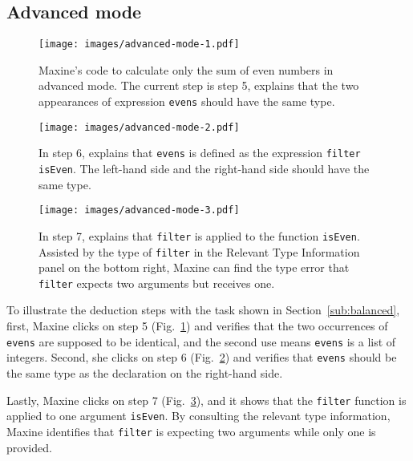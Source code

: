 \subsection{Advanced mode}  \label{sub:advanced}



\begin{figure}[ht]
        \centering
        \texttt{[image: images/advanced-mode-1.pdf]}
        \caption[\chameleon{} walkthrough - advanced mode (1)]{
            Maxine's code to calculate only the sum 
            of even numbers in advanced mode. 
            The current step is step 5, \chameleon{} 
            explains that the two appearances of expression 
            \texttt{evens} should have the same type.
        }
        \label{fig:advanced-mode-step5}
\end{figure}

\begin{figure}[ht]
        \centering
        \texttt{[image: images/advanced-mode-2.pdf]}
        \caption[\chameleon{} walkthrough - advanced mode (2)]{
            In step 6, \chameleon{} 
            explains that \texttt{evens} is defined as
            the expression \texttt{filter isEven}. The left-hand side
            and the right-hand side should have the same type.
        }
        \label{fig:advanced-mode-step6}
\end{figure}

\begin{figure}[ht]
        \centering
        \texttt{[image: images/advanced-mode-3.pdf]}
        \caption[\chameleon{} walkthrough - advanced mode (3)]{
            In step 7, \chameleon{} 
            explains that \texttt{filter} is applied to 
            the function \texttt{isEven}. Assisted by 
            the type of \texttt{filter} in the 
            Relevant Type Information panel on the bottom
            right, Maxine can find the type error that 
            \texttt{filter} expects two arguments but receives one.
        }
        \label{fig:advanced-mode-step7}
\end{figure}


To illustrate the deduction steps with the task shown in Section~\ref{sub:balanced},  first, Maxine clicks on step 5 (Fig.~\ref{fig:advanced-mode-step5}) and verifies
that the two occurrences of \texttt{evens} are supposed to be identical, and the
second use means \texttt{evens} is a list of integers. Second, she
clicks on step 6 (Fig.~\ref{fig:advanced-mode-step6}) and verifies that
\texttt{evens} should be the same type as the declaration on the right-hand
side. 


Lastly, Maxine clicks on step 7 (Fig.~\ref{fig:advanced-mode-step7}), and
it shows that the \texttt{filter} function is applied to one argument
\texttt{isEven}. By consulting the relevant type information, Maxine identifies
that \texttt{filter} is expecting two arguments while only one is provided. 

